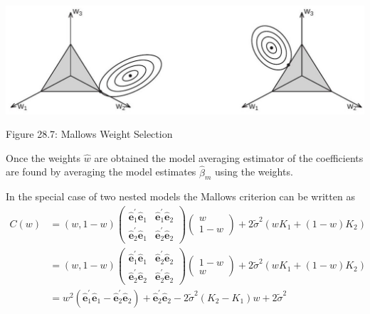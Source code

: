 \documentclass[10pt]{article}
\begin{document}
\includegraphics[max width=\textwidth]{2022_10_23_101d59f261a704807a3bg-41}

Figure 28.7: Mallows Weight Selection

Once the weights $\widehat{w}$ are obtained the model averaging estimator of the coefficients are found by averaging the model estimates $\widehat{\beta}_{m}$ using the weights.

In the special case of two nested models the Mallows criterion can be written as
$$
\begin{aligned}
C(w) &=(w, 1-w)\left(\begin{array}{cc}
\widehat{\boldsymbol{e}}_{1}^{\prime} \widehat{\boldsymbol{e}}_{1} & \widehat{\boldsymbol{e}}_{1}^{\prime} \widehat{\boldsymbol{e}}_{2} \\
\widehat{\boldsymbol{e}}_{2}^{\prime} \widehat{\boldsymbol{e}}_{1} & \widehat{\boldsymbol{e}}_{2}^{\prime} \widehat{\boldsymbol{e}}_{2}
\end{array}\right)\left(\begin{array}{c}
w \\
1-w
\end{array}\right)+2 \widetilde{\sigma}^{2}\left(w K_{1}+(1-w) K_{2}\right) \\
&=(w, 1-w)\left(\begin{array}{ll}
\widehat{\boldsymbol{e}}_{1}^{\prime} \widehat{\boldsymbol{e}}_{1} & \widehat{\boldsymbol{e}}_{2}^{\prime} \widehat{\boldsymbol{e}}_{2} \\
\widehat{\boldsymbol{e}}_{2}^{\prime} \widehat{\boldsymbol{e}}_{2} & \widehat{\boldsymbol{e}}_{2}^{\prime} \widehat{\boldsymbol{e}}_{2}
\end{array}\right)\left(\begin{array}{c}
1-w \\
w
\end{array}\right)+2 \widetilde{\sigma}^{2}\left(w K_{1}+(1-w) K_{2}\right) \\
&=w^{2}\left(\widehat{\boldsymbol{e}}_{1}^{\prime} \widehat{\boldsymbol{e}}_{1}-\widehat{\boldsymbol{e}}_{2}^{\prime} \widehat{\boldsymbol{e}}_{2}\right)+\widehat{\boldsymbol{e}}_{2}^{\prime} \widehat{\boldsymbol{e}}_{2}-2 \widetilde{\sigma}^{2}\left(K_{2}-K_{1}\right) w+2 \widetilde{\sigma}^{2}
\end{aligned}
$$
\end{document}
